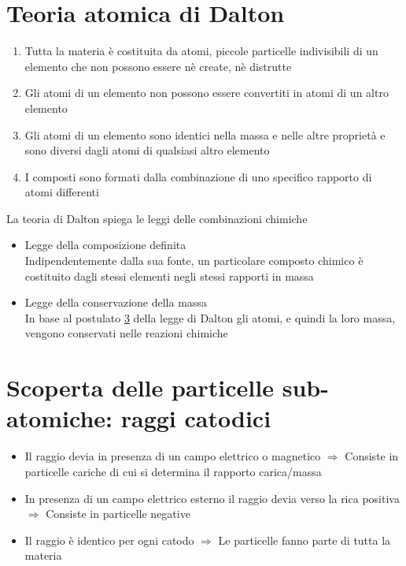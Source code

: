 \documentclass[a4paper,11pt]{report}
\begin{document}
\section{Teoria atomica di Dalton}
\begin{enumerate}
	\item Tutta la materia è costituita da atomi, piccole particelle indivisibili di un elemento che non possono essere nè create, nè distrutte
	\item Gli atomi di un elemento non possono essere convertiti in atomi di un altro elemento
	\item Gli atomi di un elemento sono identici nella massa e nelle altre proprietà e sono diversi dagli atomi di qualsiasi altro elemento \label{3}
	\item I composti sono formati dalla combinazione di uno specifico rapporto di atomi differenti
\end{enumerate}
\noindent La teoria di Dalton spiega le leggi delle combinazioni chimiche
\begin{itemize}
	\item Legge della composizione definita \hfil\\
	Indipendentemente dalla sua fonte, un particolare composto chimico è costituito dagli stessi elementi negli stessi rapporti in massa
	\item Legge della conservazione della massa \hfill\\
	In base al postulato \hyperref[3]{3} della legge di Dalton gli atomi, e quindi la loro massa, vengono conservati nelle reazioni chimiche
\end{itemize}
\section*{Scoperta delle particelle sub-atomiche: raggi catodici}
\begin{itemize}
	\item Il raggio devia in presenza di un campo elettrico o magnetico $\Rightarrow$ Consiste in particelle cariche di cui si determina il rapporto carica/massa
	\item In presenza di un campo elettrico esterno il raggio devia verso la rica positiva $\Rightarrow$ Consiste in particelle negative
	\item Il raggio è identico per ogni catodo $\Rightarrow$ Le particelle fanno parte di tutta la materia
\end{itemize}
\end{document}
